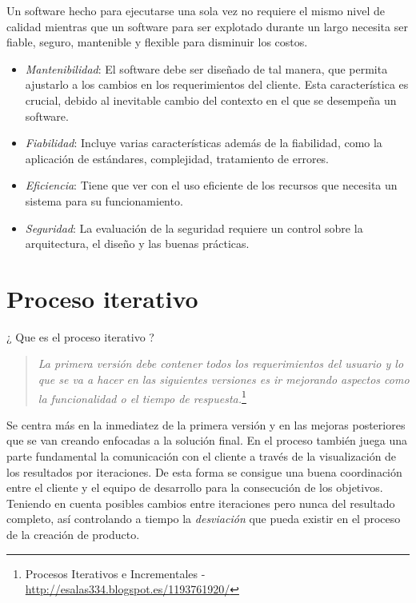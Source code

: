 \par Un software hecho para ejecutarse una sola vez no requiere el mismo nivel de calidad mientras que un software para ser explotado durante un largo necesita ser fiable, seguro, mantenible y flexible para disminuir los costos.

\begin{itemize}
	\item \emph{Mantenibilidad}: El software debe ser diseñado de tal manera, que permita ajustarlo a los cambios en los requerimientos del cliente. Esta característica es crucial, debido al inevitable cambio del contexto en el que se desempeña un software.
	\item \emph{Fiabilidad}: Incluye varias características además de la fiabilidad, como la aplicación de estándares, complejidad, tratamiento de errores.
	\item \emph{Eficiencia}: Tiene que ver con el uso eficiente de los recursos que necesita un sistema para su funcionamiento.
	\item \emph{Seguridad}: La evaluación de la seguridad requiere un control sobre la arquitectura, el diseño y las buenas prácticas.
\end{itemize}


\section{Proceso iterativo}
\label{sec:proc-iterativo}

\par ¿ Que es el proceso iterativo ?

\begin{quote}
    \emph{La primera versión debe contener todos los requerimientos del usuario y lo que se va a hacer en las siguientes versiones es ir mejorando aspectos como la funcionalidad o el tiempo de respuesta.}\footnote{Procesos Iterativos e Incrementales - \url{http://esalas334.blogspot.es/1193761920/}}
\end{quote}

\par Se centra más en la inmediatez de la primera versión y en las mejoras posteriores que se van creando enfocadas a la solución final. En el proceso también juega una parte fundamental la comunicación con el cliente a través de la visualización de los resultados por iteraciones. De esta forma se consigue una buena coordinación entre el cliente y el equipo de desarrollo para la consecución de los objetivos. Teniendo en cuenta posibles cambios entre iteraciones pero nunca del resultado completo, así controlando a tiempo la \emph{desviación} que pueda existir en el proceso de la creación de producto.

